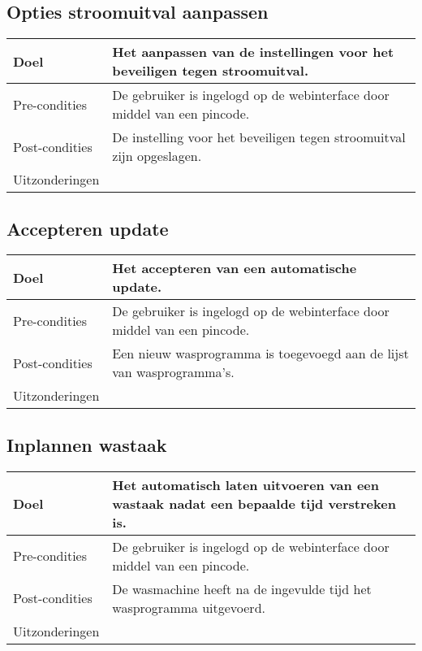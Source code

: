 \subsection{Opties stroomuitval aanpassen}
\begin{center}
  \begin{tabular}{ | p{4cm} | p{8.5cm} | }    \hline
    Doel & Het aanpassen van de instellingen voor het beveiligen tegen stroomuitval. \\ \hline
    Pre-condities & De gebruiker is ingelogd op de webinterface door middel van een pincode. \\ \hline
    Post-condities & De instelling voor het beveiligen tegen stroomuitval zijn opgeslagen. \\ \hline
    Uitzonderingen &  \\
    \hline
  \end{tabular}
\end{center}

\subsection{Accepteren update}
\begin{center}
  \begin{tabular}{ | p{4cm} | p{8.5cm} | }    \hline
    Doel & Het accepteren van een automatische update. \\ \hline
    Pre-condities & De gebruiker is ingelogd op de webinterface door middel van een pincode. \\ \hline
    Post-condities & Een nieuw wasprogramma is toegevoegd aan de lijst van wasprogramma's. \\ \hline
    Uitzonderingen &  \\
    \hline
  \end{tabular}
\end{center}

\subsection{Inplannen wastaak}
\begin{center}
  \begin{tabular}{ | p{4cm} | p{8.5cm} | }    \hline
    Doel & Het automatisch laten uitvoeren van een wastaak nadat een bepaalde tijd verstreken is. \\ \hline
    Pre-condities & De gebruiker is ingelogd op de webinterface door middel van een pincode. \\ \hline
    Post-condities & De wasmachine heeft na de ingevulde tijd het wasprogramma uitgevoerd. \\ \hline
    Uitzonderingen &  \\
    \hline
  \end{tabular}
\end{center}


